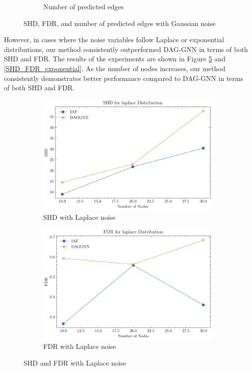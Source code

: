 \documentclass[10pt]{article}
\begin{document}
\begin{figure}[H]
\begin{subfigure}{0.3\textwidth}
        \caption{Number of predicted edges}
        \label{pred_edge_gaussian}
    \end{subfigure}
    \caption{SHD, FDR, and number of predicted edges with Gaussian noise}
    \label{SHD_FDR_gaussian}
\end{figure}

However, in cases where the noise variables follow Laplace or exponential distributions, our method consistently outperformed DAG-GNN in terms of both SHD and FDR. The results of the experiments are shown in Figure \ref*{SHD_FDR_laplace} and \ref*{SHD_FDR_exponential}. As the number of nodes increases, our method consistently demonstrates better performance compared to DAG-GNN in terms of both SHD and FDR.\\

\begin{figure}[H]
    \centering
    \begin{subfigure}{0.45\textwidth}
        \includegraphics[width=\textwidth]{fig/SHD_independence_laplace.pdf}
        \caption{SHD with Laplace noise}
        \label{SHD_laplace}
    \end{subfigure}
    \hfill
    \begin{subfigure}{0.45\textwidth}
        \includegraphics[width=\textwidth]{fig/FDR_independence_laplace.pdf}
        \caption{FDR with Laplace noise}
        \label{FDR_laplace}
    \end{subfigure}
    \caption{SHD and FDR with Laplace noise}
    \label{SHD_FDR_laplace}
\end{figure}
\end{document}
